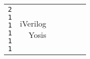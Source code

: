 \begin{center}
\begin{longtable}{|lr|c|c|c|c|}
{                 \texttt{2}                 \\
                 \texttt{1}                 \\
                 \texttt{1}                 \\
                 \texttt{1}                 \\
                 \texttt{1}                 \\
                 \texttt{1}}             &      
    \makecell[c]{iVerilog~\cite{iverilog}   \\                    
                 Yosis~\cite{yosys}}     &
    & & \\
  \end{longtable}
\end{center}
  

